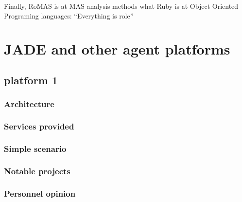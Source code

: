 \documentclass[a4paper,11pt]{report}
\begin{document}
  Finally, RoMAS is at MAS analysis methods what Ruby is at Object Oriented Programing 
  languages: ``Everything is role''
  
  
  \section{JADE and other agent platforms} %
  
  
  \subsection{platform 1} %
  
  \subsubsection{Architecture}
  
  \subsubsection{Services provided}
  
  \subsubsection{Simple scenario}
  
  \subsubsection{Notable projects}
  
  \subsubsection{Personnel opinion}
  
\end{document}
